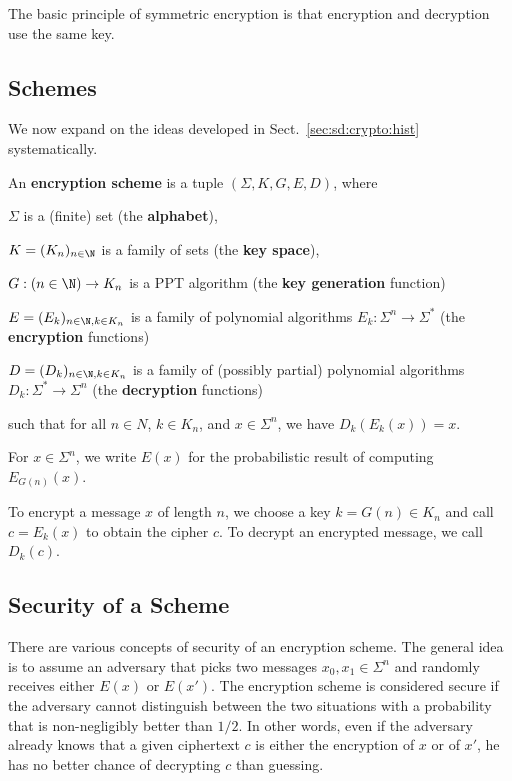 The basic principle of symmetric encryption is that encryption and decryption use the same key.

\subsection{Schemes}

We now expand on the ideas developed in Sect.~\ref{sec:sd:crypto:hist} systematically.

\begin{definition}\label{def:sd:symscheme}
 An \textbf{encryption scheme} is a tuple $(\Sigma,K,G, E, D)$, where
  \begin{compactitem}
   \item $\Sigma$ is a (finite) set (the \textbf{alphabet}),
   \item $K=(K_n)_{n\in \N}$ is a family of sets (the \textbf{key space}),
   \item $G:(n\in \N)\to K_n$ is a PPT algorithm (the \textbf{key generation} function)
   \item $E=(E_k)_{n\in\N,k\in K_n}$ is a family of polynomial algorithms $E_k:\Sigma^n\to\Sigma^*$ (the \textbf{encryption} functions)
   \item $D=(D_k)_{n\in\N,k\in K_n}$ is a family of (possibly partial) polynomial algorithms $D_k:\Sigma^*\to\Sigma^n$ (the \textbf{decryption} functions)
  \end{compactitem}
  such that for all $n\in N$, $k\in K_n$, and $x\in \Sigma^n$, we have $D_k(E_k(x))=x$.

  For $x\in\Sigma^n$, we write $E(x)$ for the probabilistic result of computing $E_{G(n)}(x)$.
\end{definition}

To encrypt a message $x$ of length $n$, we choose a key $k=G(n)\in K_n$ and call $c=E_k(x)$ to obtain the cipher $c$.
To decrypt an encrypted message, we call $D_k(c)$.

\subsection{Security of a Scheme}

There are various concepts of security of an encryption scheme.
The general idea is to assume an adversary that picks two messages $x_0,x_1\in\Sigma^n$ and randomly receives either $E(x)$ or $E(x')$.
The encryption scheme is considered secure if the adversary cannot distinguish between the two situations with a probability that is non-negligibly better than $1/2$.
In other words, even if the adversary already knows that a given ciphertext $c$ is either the encryption of $x$ or of $x'$, he has no better chance of decrypting $c$ than guessing.

